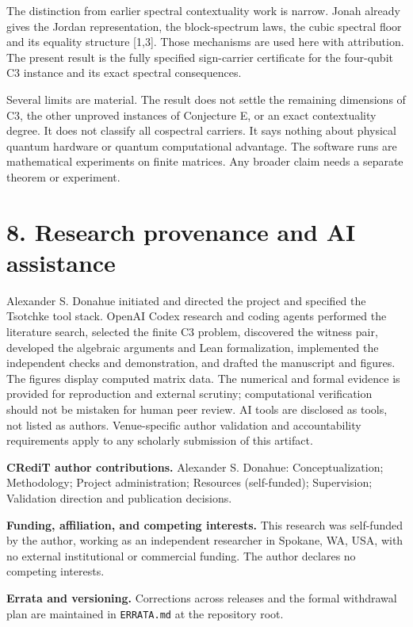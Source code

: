 \documentclass[11pt,letterpaper]{article}
\begin{document}
The distinction from earlier spectral contextuality work is narrow. Jonah already gives the Jordan representation, the block-spectrum laws, the cubic spectral floor and its equality structure {[}1,3{]}. Those mechanisms are used here with attribution. The present result is the fully specified sign-carrier certificate for the four-qubit C3 instance and its exact spectral consequences.

Several limits are material. The result does not settle the remaining dimensions of C3, the other unproved instances of Conjecture E, or an exact contextuality degree. It does not classify all cospectral carriers. It says nothing about physical quantum hardware or quantum computational advantage. The software runs are mathematical experiments on finite matrices. Any broader claim needs a separate theorem or experiment.

\section{8. Research provenance and AI assistance}\label{research-provenance-and-ai-assistance}

Alexander S. Donahue initiated and directed the project and specified the Tsotchke tool stack. OpenAI Codex research and coding agents performed the literature search, selected the finite C3 problem, discovered the witness pair, developed the algebraic arguments and Lean formalization, implemented the independent checks and demonstration, and drafted the manuscript and figures. The figures display computed matrix data. The numerical and formal evidence is provided for reproduction and external scrutiny; computational verification should not be mistaken for human peer review. AI tools are disclosed as tools, not listed as authors. Venue-specific author validation and accountability requirements apply to any scholarly submission of this artifact.

\textbf{CRediT author contributions.} Alexander S. Donahue: Conceptualization; Methodology; Project administration; Resources (self-funded); Supervision; Validation direction and publication decisions.

\textbf{Funding, affiliation, and competing interests.} This research was self-funded by the author, working as an independent researcher in Spokane, WA, USA, with no external institutional or commercial funding. The author declares no competing interests.

\textbf{Errata and versioning.} Corrections across releases and the formal withdrawal plan are maintained in \texttt{ERRATA.md} at the repository root.
\end{document}
